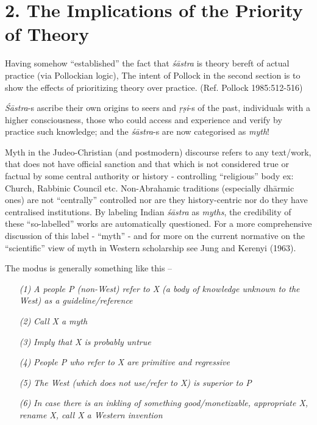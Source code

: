 \section*{2. The Implications of the Priority of Theory}

Having somehow ``established'' the fact that {\sl śāstra} is theory bereft of actual practice (via Pollockian logic), The intent of Pollock in the second section is to show the effects of prioritizing theory over practice. (Ref. Pollock 1985:512-516)

{\sl Śāstra}-s ascribe their own origins to seers and {\sl ṛṣi}-s of the past, individuals with a higher consciousness, those who could access and experience and verify by practice such knowledge; and the {\sl śāstra}-s are now categorised as {\sl myth}!

\newpage

Myth in the Judeo-Christian (and postmodern) discourse refers to any text/work, that does not have official sanction and that which is not considered true or factual by some central authority or history - controlling ``religious'' body ex: Church, Rabbinic Council etc. Non-Abrahamic traditions (especially dhārmic ones) are not ``centrally'' controlled nor are they history-centric nor do they have centralised institutions. By labeling Indian {\sl śāstra} as {\sl myths}, the credibility of these ``so-labelled'' works are automatically questioned. For a more comprehensive discussion of this label -  ``myth'' - and for more on the current normative on the ``scientific'' view of myth in Western scholarship see Jung and Kerenyi (1963).

The modus is generally something like this --
\begin{itemize}
\item[{\sl(1)}] {\sl A people P (non-West) refer to X (a body of knowledge unknown to the West) as a guideline/reference}

\item[{\sl(2)}] {\sl Call X  a myth} 

\item[{\sl(3)}] {\sl Imply that X is probably untrue}

\item[{\sl(4)}] {\sl People P who refer to X are primitive and regressive}

\item[{\sl(5)}] {\sl The West (which does not use/refer to X) is superior to P}

\item[{\sl(6)}] {\sl In case there is an inkling of something good/monetizable, appropriate X, rename X, call X a Western invention} 
\end{itemize}

